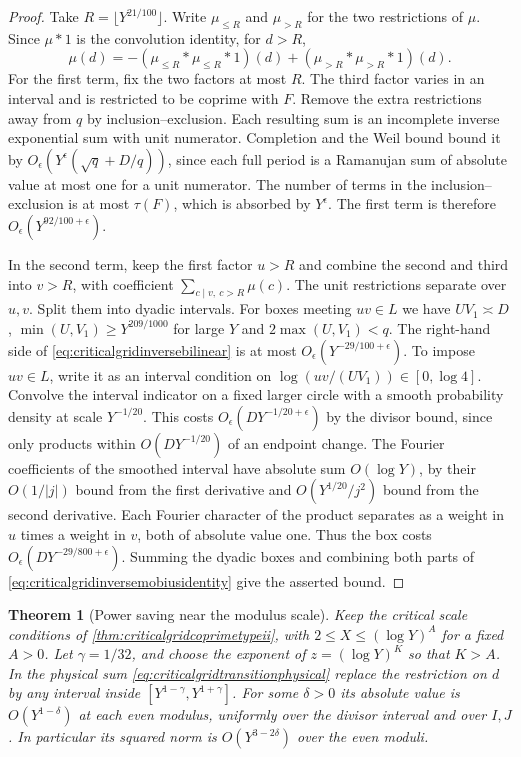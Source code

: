 \documentclass[11pt,a4paper]{article}
\numberwithin{equation}{section}
\newtheorem{theorem}{Theorem}[section]
\begin{document}
\begin{proof}
Take $R=\lfloor Y^{21/100}\rfloor$. Write $\mu_{\le R}$
and $\mu_{>R}$ for the two restrictions of $\mu$.
Since $\mu*1$ is the convolution identity, for $d>R$,
\begin{equation}
 \mu(d)=-(\mu_{\le R}*\mu_{\le R}*1)(d)
                        +(\mu_{>R}*\mu_{>R}*1)(d).
 \label{eq:criticalgridinversemobiusidentity}
\end{equation}
For the first term, fix the two factors at most $R$.
The third factor varies in an interval and is restricted
to be coprime with $F$. Remove the extra restrictions
away from $q$ by inclusion--exclusion. Each resulting
sum is an incomplete inverse exponential sum with
unit numerator. Completion and the Weil bound
\cite[(9.6)]{KnightlyLiKuznetsov} bound it by
$O_\epsilon(Y^\epsilon(\sqrt q+D/q))$, since each
full period is a Ramanujan sum of absolute value
at most one for a unit numerator. The number of terms in the
inclusion--exclusion is at most $\tau(F)$, which
is absorbed by $Y^\epsilon$. The first term is
therefore $O_\epsilon(Y^{92/100+\epsilon})$.

In the second term, keep the first factor $u>R$ and
combine the second and third into $v>R$, with coefficient
$\sum_{c\mid v,\ c>R}\mu(c)$. The unit restrictions
separate over $u,v$. Split them into dyadic intervals.
For boxes meeting $uv\in L$ we have $UV_1\asymp D$,
$\min(U,V_1)\ge Y^{209/1000}$ for large $Y$ and
$2\max(U,V_1)<q$. The right-hand side of
\cref{eq:criticalgridinversebilinear} is at most
$O_\epsilon(Y^{-29/100+\epsilon})$.
To impose $uv\in L$, write it as an interval
condition on $\log(uv/(UV_1))\in[0,\log 4]$.
Convolve the interval indicator on a fixed larger
circle with a smooth probability density at scale
$Y^{-1/20}$. This costs
$O_\epsilon(DY^{-1/20+\epsilon})$ by the divisor
bound, since only products within $O(DY^{-1/20})$
of an endpoint change. The Fourier coefficients of the
smoothed interval have absolute sum $O(\log Y)$,
by their $O(1/|j|)$ bound from the first derivative
and $O(Y^{1/20}/j^2)$ bound from the second derivative.
Each Fourier character of the product separates as a
weight in $u$ times a weight in $v$, both of absolute
value one. Thus the box costs
$O_\epsilon(DY^{-29/800+\epsilon})$.
Summing the dyadic boxes and combining both parts of
\cref{eq:criticalgridinversemobiusidentity}
give the asserted bound.
\end{proof}

\begin{theorem}[Power saving near the modulus scale]
\label{thm:criticalgridbalancedmobius}
Keep the critical scale conditions of
\cref{thm:criticalgridcoprimetypeii}, with
$2\le X\le(\log Y)^A$ for a fixed $A>0$.
Let $\gamma=1/32$, and choose the exponent of
$z=(\log Y)^K$ so that $K>A$. In the physical sum
\cref{eq:criticalgridtransitionphysical} replace the
restriction on $d$ by any interval inside
$[Y^{1-\gamma},Y^{1+\gamma}]$.
For some $\delta>0$ its absolute value is
$O(Y^{1-\delta})$ at each even modulus, uniformly over
the divisor interval and over $I,J$.
In particular its squared norm is $O(Y^{3-2\delta})$
over the even moduli.
\end{theorem}
\end{document}
